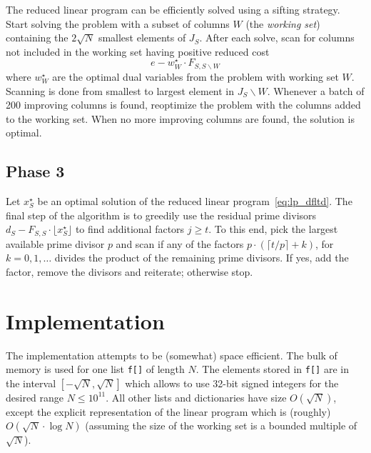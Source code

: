 \documentclass[12pt,a4paper,reqno]{amsart}
\numberwithin{equation}{section}
\begin{document}
The reduced linear program can be efficiently solved using a sifting strategy.
Start solving the problem with a subset of columns $W$ (the \emph{working
set}) containing the $2\sqrt{N}$ smallest elements of $J_S$. After each solve,
scan for columns not included in the working set having positive reduced cost
\begin{equation*}
  e - w^\star_W \cdot F_{S,S \backslash W}
\end{equation*}
where $w^\star_W$ are the optimal dual variables from the problem with working
set $W$. Scanning is done from smallest to largest element in $J_S \backslash
W$. Whenever a batch of 200 improving columns is found, reoptimize the problem
with the columns added to the working set. When no more improving columns are
found, the solution is optimal.

\subsection*{Phase 3}

Let $x^\star_S$ be an optimal solution of the reduced linear
program~\eqref{eq:lp_dfltd}. The final step of the algorithm is to greedily use
the residual prime divisors $d_S - F_{S,S} \cdot \lfloor x^\star_S \rfloor$ to
find additional factors $j \geq t$. To this end, pick the largest available
prime divisor $p$ and scan if any of the factors $p \cdot (\lceil t/p \rceil +
k)$, for $k=0, 1, \ldots$ divides the product of the remaining prime divisors.
If yes, add the factor, remove the divisors and reiterate; otherwise stop.


\section{Implementation}

The implementation attempts to be (somewhat) space efficient. The bulk of
memory is used for one list \texttt{f[]} of length $N$. The elements stored in
\texttt{f[]} are in the interval $[-\sqrt{N}, \sqrt{N}]$ which allows to use
32-bit signed integers for the desired range $N \leq 10^{11}$. All other lists
and dictionaries have size $O(\sqrt{N})$, except the explicit representation of
the linear program which is (roughly) $O(\sqrt{N} \cdot \log{N})$ (assuming the
size of the working set is a bounded multiple of $\sqrt{N}$).
\end{document}
